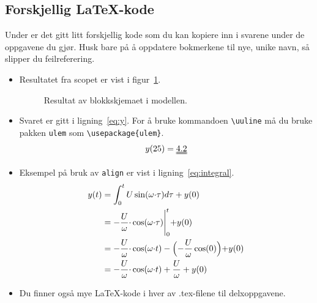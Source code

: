 \documentclass[answers,11pt]{exam}
\begin{document}
\begin{tcolorbox}
  \section*{Forskjellig {\LaTeX}-kode}
  Under er det gitt litt forskjellig kode som du kan kopiere inn i
  svarene under de oppgavene du gjør. Husk bare på å oppdatere
  bokmerkene til nye, unike navn, så slipper du feilreferering.

  \begin{itemize}
    \item    Resultatet fra scopet er vist i figur~\ref{fig:2a}.

          \begin{figure}[H]
            \centering

            \hspace*{0mm}
            \caption{Resultat av blokkskjemaet i modellen. }
            \label{fig:2a}
          \end{figure}

    \item Svaret er gitt i ligning~\eqref{eq:y}.
          For å bruke kommandoen {\tt \textbackslash uuline} må du bruke pakken
            {\tt ulem} som {\tt \textbackslash usepackage\{ulem\}}.
          \begin{equation}
            \label{eq:y}
            y(25) = \uuline{4.2}
          \end{equation}

    \item Eksempel på bruk av {\tt align} er vist i
          ligning~\eqref{eq:integral}.
          \begin{align}
            y(t) & = \int_{0}^{t} U \sin(\omega {\cdot}  \tau) d\tau +
            y(0)\notag                                                 \\
                 & =	 -\frac{U}{\omega}{\cdot}\cos(\omega{\cdot}\tau)
            \Biggl|_{0}^{t}  + y(0)\notag
            \\
                 & =-\frac{U}{\omega}{\cdot}\cos(\omega{\cdot} t)
            -\Bigl(-\frac{U}{\omega}\cos(0)\Bigl) + y(0)\notag
            \\
                 & = -\frac{U}{\omega}{\cdot}\cos(\omega{\cdot}t) +
            \frac{U}{\omega} + y(0)  \label{eq:integral}
          \end{align}

    \item Du finner også mye \LaTeX-kode i hver av .tex-filene til
          delxoppgavene.

  \end{itemize}
\end{tcolorbox}
\end{document}
